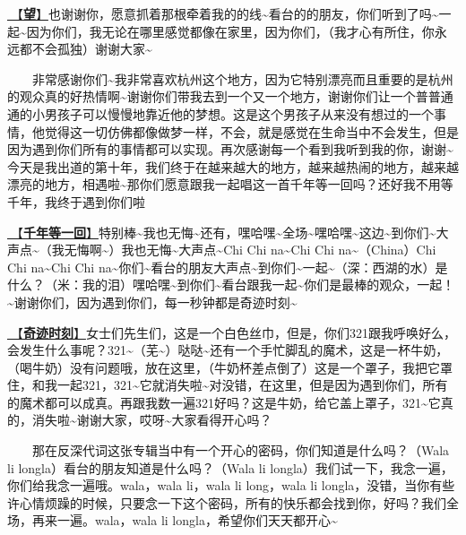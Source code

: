 \documentclass[]{ctexbook}
\begin{document}
\hyperref[hope]{🎵【\textbf{望}】}也谢谢你，愿意抓着那根牵着我的的线\textasciitilde 看台的的朋友，你们听到了吗\textasciitilde 一起\textasciitilde 因为你们，我无论在哪里感觉都像在家里，因为你们，（我才心有所住，你永远都不会孤独）谢谢大家\textasciitilde{}

  非常感谢你们\textasciitilde 我非常喜欢杭州这个地方，因为它特别漂亮而且重要的是杭州的观众真的好热情啊\textasciitilde 谢谢你们带我去到一个又一个地方，谢谢你们让一个普普通通的小男孩子可以慢慢地靠近他的梦想。这是这个男孩子从来没有想过的一个事情，他觉得这一切仿佛都像做梦一样，不会，就是感觉在生命当中不会发生，但是因为遇到你们所有的事情都可以实现。再次感谢每一个看到我听到我的你，谢谢\textasciitilde 今天是我出道的第十年，我们终于在越来越大的地方，越来越热闹的地方，越来越漂亮的地方，相遇啦\textasciitilde 那你们愿意跟我一起唱这一首千年等一回吗？还好我不用等千年，我终于遇到你们啦

\hyperref[once-in-1000]{🎵【\textbf{千年等一回}】}特别棒\textasciitilde 我也无悔\textasciitilde 还有，嘿哈嘿\textasciitilde 全场\textasciitilde 嘿哈嘿\textasciitilde 这边\textasciitilde 到你们\textasciitilde 大声点\textasciitilde（我无悔啊\textasciitilde）我也无悔\textasciitilde 大声点\textasciitilde Chi Chi na\textasciitilde Chi Chi na\textasciitilde（China）Chi Chi na\textasciitilde Chi Chi na\textasciitilde 你们\textasciitilde 看台的朋友大声点\textasciitilde 到你们\textasciitilde 一起\textasciitilde（深：西湖的水）是什么？（米：我的泪）嘿哈嘿\textasciitilde 到你们\textasciitilde 看台跟我一起\textasciitilde 你们是最棒的观众，一起！\textasciitilde 谢谢你们，因为遇到你们，每一秒钟都是奇迹时刻\textasciitilde{}

\hyperref[magic-moment]{🎵【\textbf{奇迹时刻}】}女士们先生们，这是一个白色丝巾，但是，你们321跟我呼唤好么，会发生什么事呢？321\textasciitilde（芜\textasciitilde）哒哒\textasciitilde 还有一个手忙脚乱的魔术，这是一杯牛奶，（喝牛奶）没有问题哦，放在这里，（牛奶杯差点倒了）这是一个罩子，我把它罩住，和我一起321，321\textasciitilde 它就消失啦\textasciitilde 对没错，在这里，但是因为遇到你们，所有的魔术都可以成真。再跟我数一遍321好吗？这是牛奶，给它盖上罩子，321\textasciitilde 它真的，消失啦\textasciitilde 谢谢大家，哎呀\textasciitilde 大家看得开心吗？

  那在反深代词这张专辑当中有一个开心的密码，你们知道是什么吗？（Wala li longla）看台的朋友知道是什么吗？（Wala li longla）我们试一下，我念一遍，你们给我念一遍哦。wala，wala li，wala li long，wala li longla，没错，当你有些许心情烦躁的时候，只要念一下这个密码，所有的快乐都会找到你，好吗？我们全场，再来一遍。wala，wala li longla，希望你们天天都开心\textasciitilde{}
\end{document}
